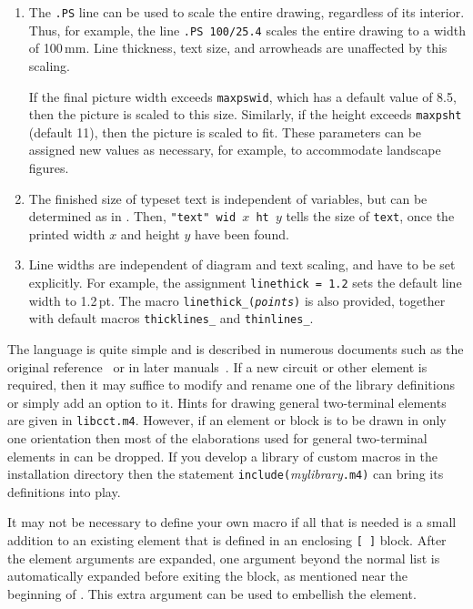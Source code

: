 \begin{enumerate}
\item The {\tt .PS} line can be used to scale the entire drawing, regardless
  of its interior.  Thus, for example, the line {\tt.PS 100/25.4}
  scales the entire drawing to a width of 100$\,$mm.
  Line thickness, text size, and \dpic arrowheads are unaffected by
  this scaling.

  If the final picture width exceeds {\tt maxpswid}, which
  has a default value of 8.5, then the picture is scaled to this size.
  Similarly, if the height exceeds {\tt maxpsht} (default 11), then the
  picture is scaled to fit.  These parameters can be assigned
  new values as necessary, for example, to accommodate landscape figures.

\item The finished size of typeset text is independent of \pic variables,
  but can be determined as in .  Then,
  {\tt "text" wid $x$ ht $y$} tells \pic the size of {\tt text},
  once the printed width $x$ and height $y$ have been found.

\item Line widths are independent of diagram and text scaling, and have
  to be set explicitly.  For example,
  the assignment {\tt linethick = 1.2} sets the default line width to 1.2\,pt.
  The macro {\tt linethick\_({\sl points})} is also provided, together
  with default macros {\tt thicklines\_} and {\tt thinlines\_}.

\end{enumerate}

The \Mfour language is quite simple and is
described in numerous documents such as the original reference~\cite{KRm4}
or in later manuals~\cite{Seindal94}.  If a new circuit
or other element is required, then it may suffice to modify and rename one of
the library definitions or simply add an option to it.
Hints for drawing general two-terminal elements are given in
{\tt libcct.m4}.  However, if an element or block is to be drawn in
only one orientation then most of the elaborations used for general
two-terminal elements in  can be dropped.
If you develop a library of custom macros in the installation
directory then the statement {\tt include(}{\sl mylibrary}{\tt.m4)}
can bring its definitions into play.

It may not be necessary to define your own macro if all that is needed is
a small addition to an existing element that is defined in an enclosing
\verb|[ ]| block.  After the element arguments are expanded,
one argument beyond the normal list is automatically expanded before
exiting the block, as mentioned near the beginning of .
This extra argument can be used to embellish the element.  

